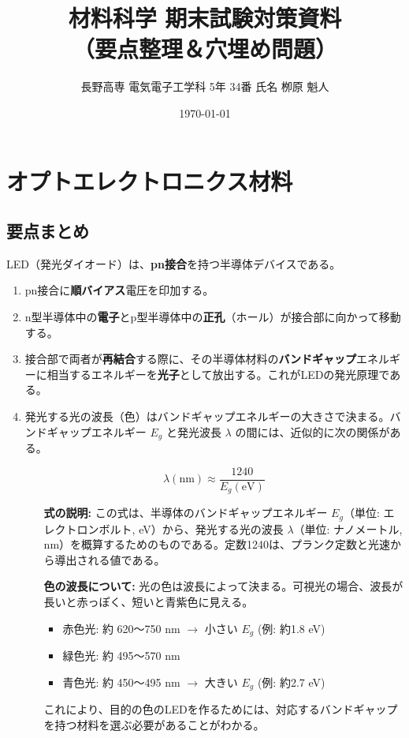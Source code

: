 \documentclass[11pt,a4paper]{ltjsarticle}
\title{材料科学 期末試験対策資料\\（要点整理＆穴埋め問題）}
\author{長野高専 電気電子工学科 5年 34番 氏名 栁原 魁人}
\date{\today}
\begin{document}
\maketitle
\thispagestyle{fancy}

\tableofcontents
\clearpage

\section{オプトエレクトロニクス材料}

\subsection{要点まとめ}
LED（発光ダイオード）は、\textbf{pn接合}を持つ半導体デバイスである。
\begin{enumerate}
    \item pn接合に\textbf{順バイアス}電圧を印加する。
    \item n型半導体中の\textbf{電子}とp型半導体中の\textbf{正孔}（ホール）が接合部に向かって移動する。
    \item 接合部で両者が\textbf{再結合}する際に、その半導体材料の\textbf{バンドギャップ}エネルギーに相当するエネルギーを\textbf{光子}として放出する。これがLEDの発光原理である。
    \item 発光する光の波長（色）はバンドギャップエネルギーの大きさで決まる。バンドギャップエネルギー $E_g$ と発光波長 $\lambda$ の間には、近似的に次の関係がある。
    \begin{tcolorbox}[colback=red!5!white,colframe=red!75!black,title=バンドギャップと波長の関係式]
    \[ \lambda (\si{\nano\meter}) \approx \frac{1240}{E_g (\si{\electronvolt})} \]
    \end{tcolorbox}
    \begin{itemize}
        \item[\textbf{式の説明:}] この式は、半導体のバンドギャップエネルギー $E_g$（単位: エレクトロンボルト, eV）から、発光する光の波長 $\lambda$（単位: ナノメートル, nm）を概算するためのものである。定数1240は、プランク定数と光速から導出される値である。
        \item[\textbf{色の波長について:}] 光の色は波長によって決まる。可視光の場合、波長が長いと赤っぽく、短いと青紫色に見える。
        \begin{itemize}
            \item 赤色光: 約 620～750 nm $\rightarrow$ 小さい $E_g$ (例: 約1.8 eV)
            \item 緑色光: 約 495～570 nm
            \item 青色光: 約 450～495 nm $\rightarrow$ 大きい $E_g$ (例: 約2.7 eV)
        \end{itemize}
        これにより、目的の色のLEDを作るためには、対応するバンドギャップを持つ材料を選ぶ必要があることがわかる。
    \end{itemize}
\end{enumerate}
\end{document}
